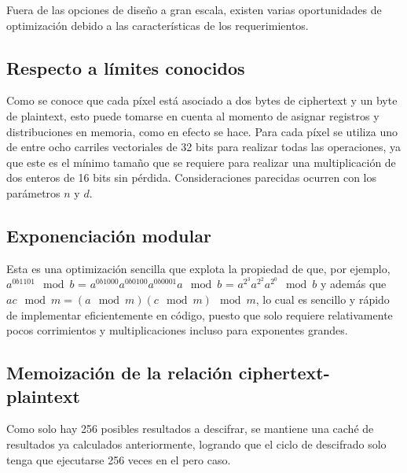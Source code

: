 \documentclass[conference, 14pt]{IEEEtran}
\begin{document}
Fuera de las opciones de diseño a gran escala, existen varias oportunidades de
optimización debido a las características de los requerimientos.

\subsection{Respecto a límites conocidos}

Como se conoce que cada píxel está asociado a dos bytes de ciphertext y un byte
de plaintext, esto puede tomarse en cuenta al momento de asignar registros y
distribuciones en memoria, como en efecto se hace. Para cada píxel se utiliza
uno de entre ocho carriles vectoriales de 32 bits para realizar todas las
operaciones, ya que este es el mínimo tamaño que se requiere para realizar una
multiplicación de dos enteros de 16 bits sin pérdida. Consideraciones parecidas
ocurren con los parámetros $n$ y $d$.

\subsection{Exponenciación modular}

Esta es una optimización sencilla que explota la propiedad de que, por ejemplo,
$a^{0b1101} \mod b$ = $a^{0b1000}a^{0b0100}a^{0b0001}a \mod b$ =
$a^{2^3}a^{2^2}a^{2^0} \mod b$ y además que $ac \mod m = (a \mod m)(c \mod m)
\mod m$, lo cual es sencillo y rápido de implementar eficientemente en código,
puesto que solo requiere relativamente pocos corrimientos y multiplicaciones
incluso para exponentes grandes.\parencite{modexp}

\subsection{Memoización de la relación ciphertext-plaintext}

Como solo hay 256 posibles resultados a descifrar, se mantiene una caché de
resultados ya calculados anteriormente, logrando que el ciclo de descifrado
solo tenga que ejecutarse 256 veces en el pero caso.

\printbibliography[title={Referencias}]
\end{document}
